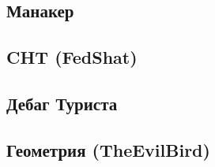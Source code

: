 \documentclass[a4paper]{article}
\begin{document}
\begin{multicols*}{2}
        \subsection{Манакер}
            
            
        \subsection{CHT (FedShat)}
            
        
        \subsection{Дебаг Туриста}
            
        
        \subsection{Геометрия (TheEvilBird)}
            
    
    
\end{multicols*}
\end{document}

